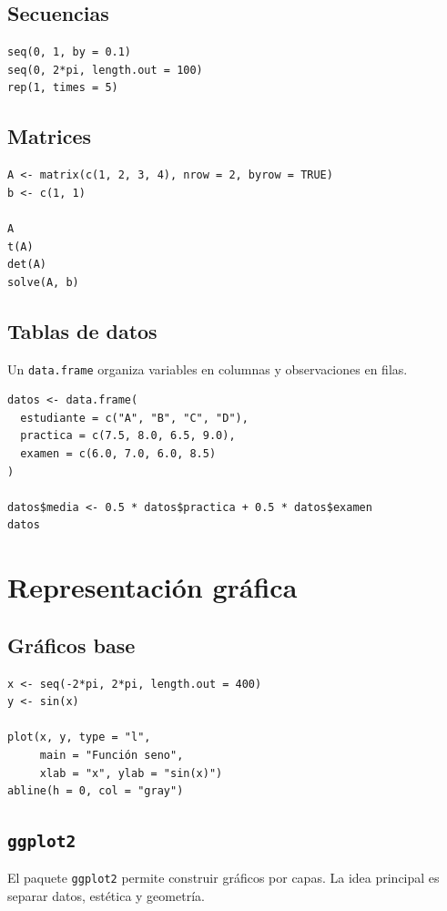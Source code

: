 \documentclass[11pt,a4paper,oneside]{book}
\begin{document}
\section{Secuencias}
\begin{lstlisting}[style=rstyle]
seq(0, 1, by = 0.1)
seq(0, 2*pi, length.out = 100)
rep(1, times = 5)
\end{lstlisting}

\section{Matrices}
\begin{lstlisting}[style=rstyle]
A <- matrix(c(1, 2, 3, 4), nrow = 2, byrow = TRUE)
b <- c(1, 1)

A
t(A)
det(A)
solve(A, b)
\end{lstlisting}

\section{Tablas de datos}
Un \texttt{data.frame} organiza variables en columnas y observaciones en filas.

\begin{lstlisting}[style=rstyle]
datos <- data.frame(
  estudiante = c("A", "B", "C", "D"),
  practica = c(7.5, 8.0, 6.5, 9.0),
  examen = c(6.0, 7.0, 6.0, 8.5)
)

datos$media <- 0.5 * datos$practica + 0.5 * datos$examen
datos
\end{lstlisting}

\chapter{Representación gráfica}

\section{Gráficos base}
\begin{lstlisting}[style=rstyle]
x <- seq(-2*pi, 2*pi, length.out = 400)
y <- sin(x)

plot(x, y, type = "l",
     main = "Función seno",
     xlab = "x", ylab = "sin(x)")
abline(h = 0, col = "gray")
\end{lstlisting}

\section{\texttt{ggplot2}}
El paquete \texttt{ggplot2} permite construir gráficos por capas. La idea principal es separar datos, estética y geometría.
\end{document}
